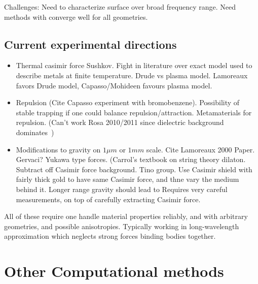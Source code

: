 Challenges:  Need to characterize surface over broad frequency range.
Need methods with converge well for all geometries.  

\subsection{Current experimental directions}
\begin{itemize}
\item Thermal casimir force
Sushkov\cite{Sushkov2011}.
Fight in literature over exact model used to describe metals at finite temperature.
Drude vs plasma model.  
 Lamoreaux favors Drude model, Capasso/Mohideen favours plasma model.
\item Repulsion (Cite Capasso experiment with bromobenzene).  Possibility of stable trapping
  if one could balance repulsion/attraction.  
 Metamaterials for repulsion.  (Can't work Rosa 2010/2011 since dielectric
  background dominates~\cite{Rosa2008})
  
\item Modifications to gravity on $1\mu m$ or $1mm$ scale.  Cite Lamoreaux 2000 Paper.  Gervaci?
Yukawa type forces.  (Carrol's textbook on string theory dilaton.  
 Subtract off Casimir force background.
  Tino group.
  Use Casimir shield with fairly thick gold to have same Casimir force, and thne vary the medium behind it.
  Longer range gravity should lead to 
Requires very careful measurements, on top of carefully extracting Casimir force.   
\end{itemize}
All of these require one handle material properties reliably, and with arbitrary geometries,
and possible anisotropies.  Typically working in long-wavelength approximation which neglects strong
forces binding bodies together.    



\section{Other Computational methods}

